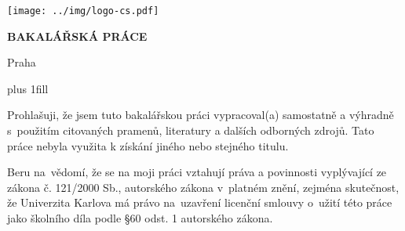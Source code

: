 

\pagestyle{empty}
\hypersetup{pageanchor=false}

\begin{center}

    \centerline{\mbox{\texttt{[image: ../img/logo-cs.pdf]}}}

    \vspace{-8mm}
    \vfill

    {\bf\Large BAKALÁŘSKÁ PRÁCE}

    \vfill

    {\LARGE\AutorPrace}

    \vspace{15mm}

    {\LARGE\bfseries\NazevPrace}

    \vfill

    \Katedra

    \vfill

    {
        \centerline{\vbox{}}}

    \vfill

    Praha \RokOdevzdani

\end{center}

\newpage



\openright
\hypersetup{pageanchor=true}
\pagestyle{plain}
\vglue 0pt plus 1fill

\noindent
Prohlašuji, že jsem tuto bakalářskou práci vypracoval(a) samostatně a výhradně
s~použitím citovaných pramenů, literatury a dalších odborných zdrojů.
Tato práce nebyla využita k získání jiného nebo stejného titulu.

\medskip\noindent
Beru na~vědomí, že se na moji práci vztahují práva a povinnosti vyplývající
ze zákona č. 121/2000 Sb., autorského zákona v~platném znění, zejména skutečnost,
že Univerzita Karlova má právo na~uzavření licenční smlouvy o~užití této
práce jako školního díla podle §60 odst. 1 autorského zákona.

